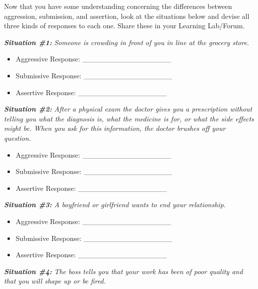 \documentclass[
]{book}
\providecommand{\tightlist}{%
  \setlength{\itemsep}{0pt}\setlength{\parskip}{0pt}}
\begin{document}
\begin{reflect}
Now that you have some understanding concerning the differences between aggression, submission, and assertion, look at the situations below and devise all three kinds of responses to each one. Share these in your Learning Lab/Forum.

\textbf{\emph{Situation \#1:}} \emph{Someone is crowding in front of you in line at the grocery store.}

\begin{itemize}
\tightlist
\item
  Aggressive Response: \_\_\_\_\_\_\_\_\_\_\_\_\_\_\_\_\_\\
\item
  Submissive Response: \_\_\_\_\_\_\_\_\_\_\_\_\_\_\_\_\_\\
\item
  Assertive Response: \_\_\_\_\_\_\_\_\_\_\_\_\_\_\_\_\_
\end{itemize}

\textbf{\emph{Situation \#2:}} \emph{After a physical exam the doctor gives you a prescription without telling you what the diagnosis is, what the medicine is for, or what the side effects might be. When you ask for this information, the doctor brushes off your question.}

\begin{itemize}
\tightlist
\item
  Aggressive Response: \_\_\_\_\_\_\_\_\_\_\_\_\_\_\_\_\_\\
\item
  Submissive Response: \_\_\_\_\_\_\_\_\_\_\_\_\_\_\_\_\_\\
\item
  Assertive Response: \_\_\_\_\_\_\_\_\_\_\_\_\_\_\_\_\_
\end{itemize}

\textbf{\emph{Situation \#3:}} \emph{A boyfriend or girlfriend wants to end your relationship.}

\begin{itemize}
\tightlist
\item
  Aggressive Response: \_\_\_\_\_\_\_\_\_\_\_\_\_\_\_\_\_\\
\item
  Submissive Response: \_\_\_\_\_\_\_\_\_\_\_\_\_\_\_\_\_\\
\item
  Assertive Response: \_\_\_\_\_\_\_\_\_\_\_\_\_\_\_\_\_
\end{itemize}

\textbf{\emph{Situation \#4:}} \emph{The boss tells you that your work has been of poor quality and that you will shape up or be fired.}


\end{reflect}
\end{document}
